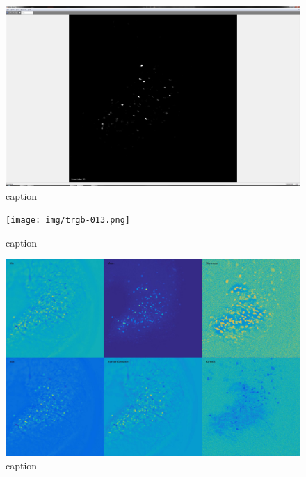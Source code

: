 \begin{figure}[htb]\centering
\includegraphics[width=15cm]{sw-sequence-bw.png}
\caption{caption}
\end{figure}

\begin{figure}[htb]\centering
\texttt{[image: img/trgb-013.png]}
\caption{caption}
\end{figure}

\begin{figure}[htb]\centering
\includegraphics[width=15cm]{statistics_of_128_frames_contrast_enhanced.jpg}
\caption{caption}
\end{figure}

\clearpage
